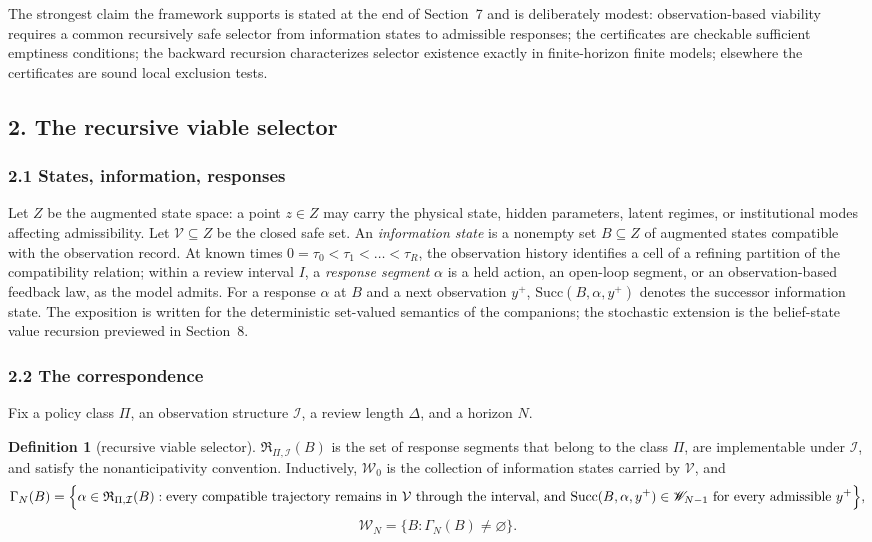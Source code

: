 \documentclass[10pt,twocolumn]{article}
\theoremstyle{definition}
\newtheorem{definition}{Definition}
\begin{document}
The strongest claim the framework supports is stated at the end of
Section~7 and is deliberately modest: observation-based viability requires a
common recursively safe selector from information states to admissible
responses; the certificates are checkable sufficient emptiness conditions;
the backward recursion characterizes selector existence exactly in
finite-horizon finite models; elsewhere the certificates are sound local
exclusion tests.

\subsection{2. The recursive viable selector}\label{selector}

\subsubsection{2.1 States, information, responses}\label{model}

Let \(Z\) be the augmented state space: a point \(z \in Z\) may carry the
physical state, hidden parameters, latent regimes, or institutional modes
affecting admissibility. Let \(\mathcal{V} \subseteq Z\) be the closed safe
set. An \emph{information state} is a nonempty set
\(B \subseteq Z\) of augmented states compatible with the observation
record. At known times \(0 = \tau_0 < \tau_1 < \dots < \tau_R\), the
observation history identifies a cell of a refining partition of the
compatibility relation; within a review interval \(I\), a \emph{response
segment} \(\alpha\) is a held action, an open-loop segment, or an
observation-based feedback law, as the model admits. For a response
\(\alpha\) at \(B\) and a next observation \(y^{+}\),
\(\mathrm{Succ}(B, \alpha, y^{+})\) denotes the successor information state.
The exposition is written for the deterministic set-valued semantics of the
companions; the stochastic extension is the belief-state value recursion
previewed in Section~8.

\subsubsection{2.2 The correspondence}\label{gamma}

Fix a policy class \(\Pi\), an observation structure
\(\mathcal{I}\), a review length \(\Delta\), and a horizon \(N\).

\begin{definition}[recursive viable selector]\label{def:gamma}
\(\mathfrak{R}_{\Pi,\mathcal{I}}(B)\) is the set of response segments that
belong to the class \(\Pi\), are implementable under \(\mathcal{I}\), and
satisfy the nonanticipativity convention. Inductively, \(\mathscr{W}_0\) is
the collection of information states carried by \(\mathcal{V}\), and
\[
\Gamma_{N}(B) = \Bigl\{ \alpha \in \mathfrak{R}_{\Pi,\mathcal{I}}(B) :
\text{every compatible trajectory remains in } \mathcal{V} \text{ through
the interval, and } \mathrm{Succ}(B, \alpha, y^{+}) \in \mathscr{W}_{N-1}
\text{ for every admissible } y^{+} \Bigr\},
\]
\[
\mathscr{W}_{N} = \{ B : \Gamma_{N}(B) \neq \varnothing \}.
\]
\end{definition}
\end{document}
